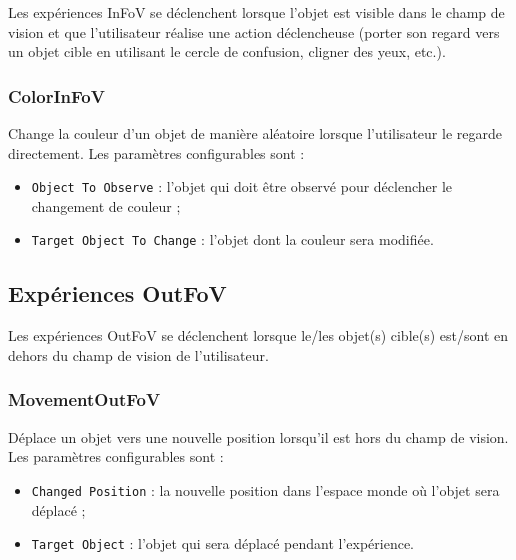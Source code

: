 \documentclass[12pt]{report}
\begin{document}
Les expériences InFoV se déclenchent lorsque l'objet est visible dans le champ de vision et que l'utilisateur réalise une action déclencheuse (porter son regard vers un objet cible en utilisant le cercle de confusion, cligner des yeux, etc.).

\subsubsection{ColorInFoV}
Change la couleur d'un objet de manière aléatoire lorsque l'utilisateur le regarde directement. Les paramètres configurables sont :
\begin{itemize}
    \vspace{2mm}
    \item \texttt{Object To Observe} : l'objet qui doit être observé pour déclencher le changement de couleur ;
    \vspace{2mm}
    \item \texttt{Target Object To Change} : l'objet dont la couleur sera modifiée.
    \vspace{2mm}
\end{itemize}

\subsection{Expériences OutFoV}

Les expériences OutFoV se déclenchent lorsque le/les objet(s) cible(s) est/sont en dehors du champ de vision de l'utilisateur.

\subsubsection{MovementOutFoV}
Déplace un objet vers une nouvelle position lorsqu'il est hors du champ de vision. Les paramètres configurables sont :
\begin{itemize}
    \vspace{2mm}
    \item \texttt{Changed Position} : la nouvelle position dans l'espace monde où l'objet sera déplacé ;
    \vspace{2mm}
    \item \texttt{Target Object} : l'objet qui sera déplacé pendant l'expérience.
    \vspace{2mm}
\end{itemize}
\end{document}
